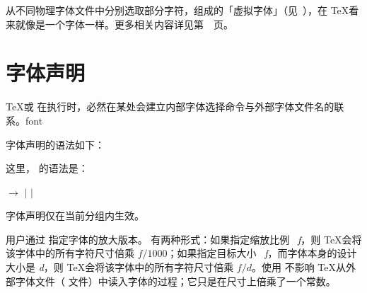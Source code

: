 \documentclass{book}
\begin{document}
从不同物理字体文件中分别选取部分字符，组成的「虚拟字体」（见~\cite{K:virt}），在 \TeX 看来就像是一个字体一样。更多相关内容详见第~\pageref{virtual:fonts}~页。

\section{字体声明}

\TeX 或 \IniTeX 在执行时，必然在某处会建立内部字体选择命令与外部字体文件名的联系。\cstoidx font\par 字体声明的语法如下：
\begin{disp}
\end{disp}
这里， 的语法是：
\begin{disp}
 $\longrightarrow$   $|$   $|$ 
\end{disp}
字体声明仅在当前分组内生效。

用户通过  指定字体的放大版本。 有两种形式：如果指定缩放比例 ~{\itshape f\/}，则 \TeX 会将该字体中的所有字符尺寸倍乘 $f/1000$；如果指定目标大小 ~{\itshape f\/}，而字体本身的设计大小是 {\itshape d\/}，则 \TeX 会将该字体中的所有字符尺寸倍乘 $f/d$。使用  不影响 \TeX 从外部字体文件（ 文件）中读入字体的过程；它只是在尺寸上倍乘了一个常数。
\end{document}
